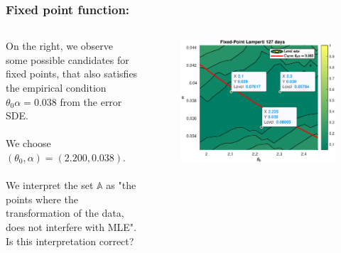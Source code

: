 \documentclass[aspectratio=169]{beamer}\usepackage[utf8]{inputenc}
\begin{document}
\begin{frame}\frametitle{Fixed point function:}

\begin{columns}

On the right, we observe some possible candidates for fixed points, that also satisfies the empirical condition $\theta_0\alpha=0.038$ from the error SDE.\\
\quad\\
We choose $(\theta_0,\alpha)=(2.200,0.038)$.\\
\quad\\
We interpret the set $\mathbb{A}$ as "the points where the transformation of the data, does not interfere with MLE". \alert{Is this interpretation correct?}

\begin{figure}[ht!]
\centering
\includegraphics[width=1\textwidth]{../../MATLAB_Files/Results/likelihood/lamperti/Log-Likelihood_2.eps}
\end{figure}

\end{columns}

\end{frame}

\end{document}
